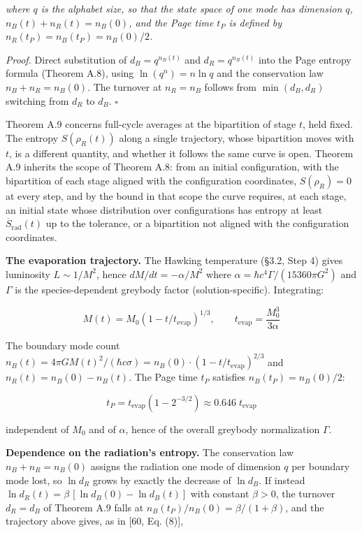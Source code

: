 \documentclass[
]{article}
\begin{document}
\emph{where \(q\) is the alphabet size, so that the state space of one
mode has dimension \(q\), \(n_B(t) + n_R(t) = n_B(0)\), and the Page
time \(t_P\) is defined by \(n_R(t_P) = n_B(t_P) = n_B(0)/2\).}

\emph{Proof.} Direct substitution of \(d_B = q^{n_B(t)}\) and
\(d_R = q^{n_R(t)}\) into the Page entropy formula (Theorem A.8), using
\(\ln(q^n) = n \ln q\) and the conservation law \(n_B + n_R = n_B(0)\).
The turnover at \(n_R = n_B\) follows from \(\min(d_B, d_R)\) switching
from \(d_R\) to \(d_B\). \(\square\)

Theorem A.9 concerns full-cycle averages at the bipartition of stage
\(t\), held fixed. The entropy \(S(\rho_R(t))\) along a single
trajectory, whose bipartition moves with \(t\), is a different quantity,
and whether it follows the same curve is open. Theorem A.9 inherits the
scope of Theorem A.8: from an initial configuration, with the
bipartition of each stage aligned with the configuration coordinates,
\(S(\rho_R) = 0\) at every step, and by the bound in that scope the
curve requires, at each stage, an initial state whose distribution over
configurations has entropy at least \(\overline{S}_{\text{rad}}(t)\) up
to the tolerance, or a bipartition not aligned with the configuration
coordinates.

\textbf{The evaporation trajectory.} The Hawking temperature (§3.2, Step
4) gives luminosity \(L \sim 1/M^2\), hence \(dM/dt = -\alpha/M^2\)
where \(\alpha = \hbar c^4 \Gamma / (15360 \pi G^2)\) and \(\Gamma\) is
the species-dependent greybody factor (solution-specific). Integrating:

\[M(t) = M_0\!\left(1 - t/t_{\text{evap}}\right)^{1/3}, \qquad t_{\text{evap}} = \frac{M_0^3}{3\alpha}\]

The boundary mode count
\(n_B(t) = 4\pi G M(t)^2 / (\hbar c \sigma) = n_B(0) \cdot (1 - t/t_{\text{evap}})^{2/3}\)
and \(n_R(t) = n_B(0) - n_B(t)\). The Page time \(t_P\) satisfies
\(n_B(t_P) = n_B(0)/2\):

\[t_P = t_{\text{evap}}\!\left(1 - 2^{-3/2}\right) \approx 0.646 \; t_{\text{evap}}\]

independent of \(M_0\) and of \(\alpha\), hence of the overall greybody
normalization \(\Gamma\).

\textbf{Dependence on the radiation's entropy.} The conservation law
\(n_B + n_R = n_B(0)\) assigns the radiation one mode of dimension \(q\)
per boundary mode lost, so \(\ln d_R\) grows by exactly the decrease of
\(\ln d_B\). If instead
\(\ln d_R(t) = \beta\,[\ln d_B(0) - \ln d_B(t)]\) with constant
\(\beta > 0\), the turnover \(d_R = d_B\) of Theorem A.9 falls at
\(n_B(t_P)/n_B(0) = \beta/(1+\beta)\), and the trajectory above gives,
as in {[}60, Eq. (8){]},
\end{document}

